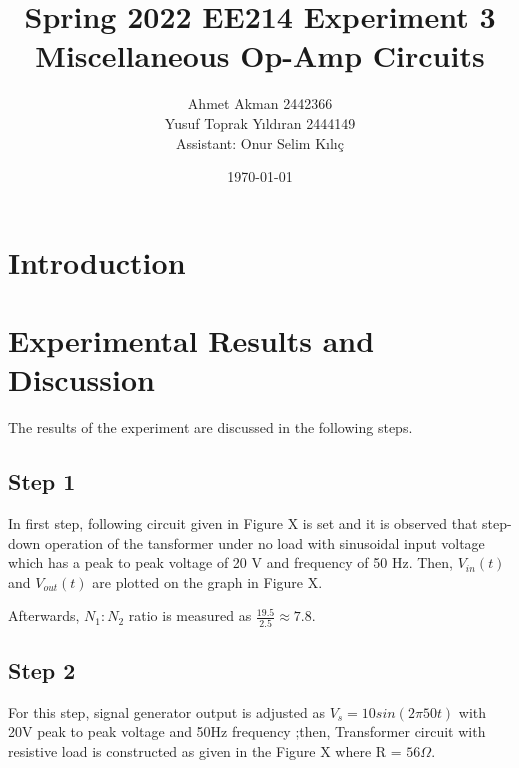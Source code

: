 \documentclass[letterpaper,12pt]{article}
\begin{document}
\thispagestyle{empty}

\title{Spring 2022 EE214 Experiment 3  \protect\\ Miscellaneous Op-Amp Circuits}
\author{Ahmet Akman 2442366 \protect\\ Yusuf Toprak Yıldıran 2444149 \protect\\ Assistant: Onur Selim Kılıç}
\date{\today}
\maketitle
\tableofcontents
\section{Introduction}

\section{Experimental Results and Discussion}
The results of the experiment are discussed in the following steps.
%
\subsection{Step 1}

In first step, following circuit given in Figure X is set and it is observed that step-down operation of the tansformer under no load with sinusoidal input voltage which has a peak to peak voltage of 20 V and frequency of 50 Hz. Then, \(V_{in}(t) \) and \(V_{out}(t)\) are plotted on the graph in Figure X.

Afterwards, \(N_1:N_2\) ratio is measured as \(\frac{19.5}{2.5}\approx 7.8 \).

%
\subsection{Step 2}
For this step, signal generator output is adjusted as \(V_s = 10sin(2\pi50t)\) with 20V peak to peak voltage and 50Hz frequency ;then, Transformer circuit with resistive load is constructed as given in the Figure X where R = \(56\Omega \).  
\end{document}
